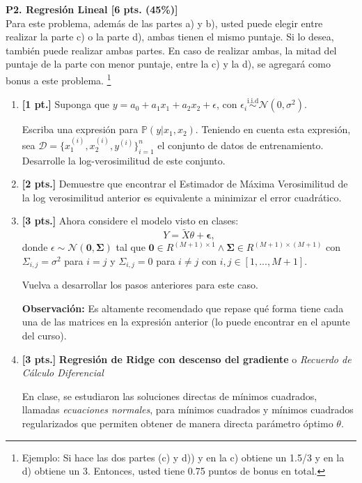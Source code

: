 \documentclass[letterpaper,11pt]{article}
\theoremstyle{plain}
\theoremstyle{definition}
\newcommand{\1}{\mathbbm{1}}
\begin{document}
\textbf{P2. Regresión Lineal [6 pts. (45\%)]} \\

Para este problema, además de las partes a) y b), usted puede elegir entre realizar la parte c) o la parte d), ambas tienen el mismo puntaje. Si lo desea, también puede realizar ambas partes. En caso de realizar ambas, la mitad del puntaje de la parte con menor puntaje, entre la c) y la d), se agregará como bonus a este problema. \footnote{Ejemplo: Si hace las dos partes (c) y d)) y en la c) obtiene un 1.5/3 y en la d) obtiene un 3. Entonces, usted tiene 0.75 puntos de bonus en total.}

\begin{enumerate}[label=\alph*)]
    \item  \textbf{[1 pt.]}
    Suponga que $y = a_0 + a_1 x_1 + a_2 x_2 + \epsilon$, con $ \epsilon_i \overset{\text{i.i.d}}{\sim} \mathcal{N}(0,\sigma^2) $. 
    
    Escriba una expresión para $\mathbb{P}(y |x_1, x_2)$. Teniendo en cuenta esta expresión, sea $\mathcal{D} = \{x_1^{(i)},x_2^{(i)}, y ^{(i)} \}_{i=1}^n$ el conjunto de datos de entrenamiento. Desarrolle la log-verosimilitud de este conjunto. 
    
    \item  \textbf{[2 pts.]}
    Demuestre que encontrar el Estimador de Máxima Verosimilitud de la log verosimilitud anterior es equivalente a minimizar el error cuadrático. 
    
    \item \textbf{[3 pts.]}
    Ahora considere el modelo visto en clases: 
    $$
        Y=  \tilde{X} \theta + \mathbf{\epsilon},
    $$
    donde  $\epsilon \sim \mathcal{N}(\mathbf{0}, \mathbf{\Sigma})$ tal que  $\mathbf{0} \in R^{(M+1) \times 1} \land \mathbf{\Sigma} \in R^{(M+1)\times (M+1)}$ con $\Sigma_{i,j} = \sigma^2$ para $i=j$ y $\Sigma_{i,j} = 0$ para $i\neq j$ con $i,j\in[1,...,M+1]$.
    
    Vuelva a desarrollar los pasos anteriores para este caso.
     
    \textbf{Observación: } Es altamente recomendado que repase qué forma tiene cada una de las matrices en la expresión anterior (lo puede encontrar en el apunte del curso).
    
    \item  \textbf{[3 pts.]} \textbf{ Regresión de Ridge con descenso del gradiente} o \textit{Recuerdo de Cálculo Diferencial}
    
    En clase, se estudiaron las soluciones directas de mínimos cuadrados, llamadas \textit{ecuaciones normales}, para mínimos cuadrados y mínimos cuadrados regularizados que permiten obtener de manera directa parámetro óptimo $\theta$.
    

\end{enumerate}
\end{document}
